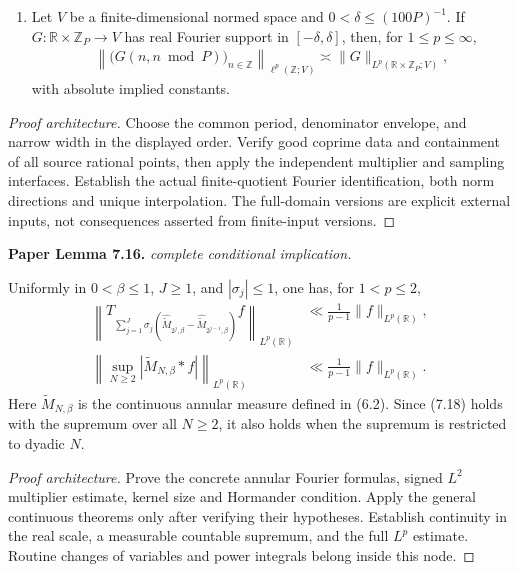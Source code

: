 \begin{lemma}
\begin{enumerate}
\begin{align}
 \leq
 \|\mathcal S_\Omega^{-1}f\|_{L^p(\mathbb A_{\mathbb Z})}
 \leq
  C_{r,k}\|f\|_{\ell^p(\mathbb Z)}
\end{align}
for \(p_r\leq p\leq2r\).
\item
Let \(V\) be a finite-dimensional normed space and
\(0<\delta\leq(100P)^{-1}\).  If
\(G:\mathbb R\times\mathbb Z_P\to V\) has real Fourier support in
\([-\delta,\delta]\), then, for \(1\leq p\leq\infty\),
\begin{align}
 \left\|
 \bigl(G(n,n\bmod P)\bigr)_{n\in\mathbb Z}
 \right\|_{\ell^p(\mathbb Z;V)}
 \asymp
 \|G\|_{L^p(\mathbb R\times\mathbb Z_P;V)},
\end{align}
with absolute implied constants.
\end{enumerate}
\end{lemma}
\begin{proof}[Proof architecture]
\leanok
Choose the common period, denominator envelope, and narrow width in the displayed order. Verify good coprime data and containment of all source rational points, then apply the independent multiplier and sampling interfaces. Establish the actual finite-quotient Fourier identification, both norm directions and unique interpolation. The full-domain versions are explicit external inputs, not consequences asserted from finite-input versions.
\end{proof}

\begin{lemma}
\label{continuous_annuli}
\leanok
\par\medskip\noindent\textbf{Paper Lemma 7.16.} \textit{complete conditional implication.}\par
Uniformly in \(0<\beta\leq1\), \(J\geq1\), and
\(|\sigma_j|\leq1\), one has, for \(1<p\leq2\),
\begin{align}
 \left\|
 T_{\sum_{j=1}^J\sigma_j
   (\widehat{\widetilde M}_{2^j,\beta}
    -\widehat{\widetilde M}_{2^{j-1},\beta})}f
 \right\|_{L^p(\mathbb R)}
 &\ll
 \frac1{p-1}\|f\|_{L^p(\mathbb R)},
 \\
 \left\|
 \sup_{N\geq2}
 |\widetilde M_{N,\beta}*f|
 \right\|_{L^p(\mathbb R)}
 &\ll
 \frac1{p-1}\|f\|_{L^p(\mathbb R)}.
\end{align}
Here \(\widetilde M_{N,\beta}\) is the continuous annular measure
defined in \textup{(6.2)}.  Since \textup{(7.18)} holds with
the supremum over all \(N\geq2\), it also holds when the supremum is
restricted to dyadic \(N\).
\end{lemma}
\begin{proof}[Proof architecture]
\leanok
Prove the concrete annular Fourier formulas, signed $L^2$ multiplier estimate, kernel size and Hormander condition. Apply the general continuous theorems only after verifying their hypotheses. Establish continuity in the real scale, a measurable countable supremum, and the full $L^p$ estimate. Routine changes of variables and power integrals belong inside this node.
\end{proof}


